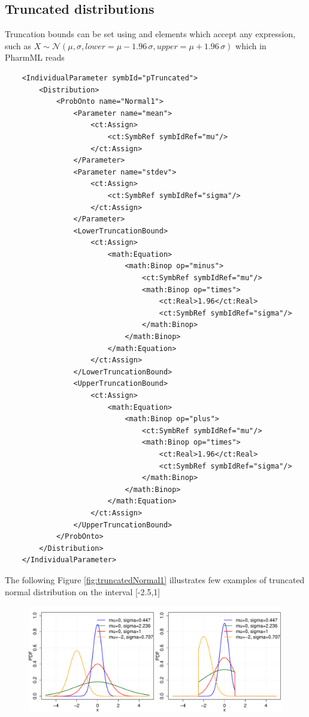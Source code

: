 {\subsection{Truncated distributions}
Truncation bounds can be set using  and 
 elements which accept any expression, such as
$X \sim \mathcal N(\mu,\sigma,lower=\mu-1.96\,\sigma,upper=\mu+1.96\,\sigma)$
which in PharmML reads
\lstset{language=XML}
\begin{lstlisting}
    <IndividualParameter symbId="pTruncated">
        <Distribution>
            <ProbOnto name="Normal1">
                <Parameter name="mean">
                    <ct:Assign>
                        <ct:SymbRef symbIdRef="mu"/>
                    </ct:Assign>
                </Parameter>
                <Parameter name="stdev">
                    <ct:Assign>
                        <ct:SymbRef symbIdRef="sigma"/>
                    </ct:Assign>
                </Parameter>
                <LowerTruncationBound>
                    <ct:Assign>
                        <math:Equation>
                            <math:Binop op="minus">
                                <ct:SymbRef symbIdRef="mu"/>
                                <math:Binop op="times">
                                    <ct:Real>1.96</ct:Real>
                                    <ct:SymbRef symbIdRef="sigma"/>
                                </math:Binop>
                            </math:Binop>
                        </math:Equation>
                    </ct:Assign>
                </LowerTruncationBound>
                <UpperTruncationBound>
                    <ct:Assign>
                        <math:Equation>
                            <math:Binop op="plus">
                                <ct:SymbRef symbIdRef="mu"/>
                                <math:Binop op="times">
                                    <ct:Real>1.96</ct:Real>
                                    <ct:SymbRef symbIdRef="sigma"/>
                                </math:Binop>
                            </math:Binop>
                        </math:Equation>
                    </ct:Assign>
                </UpperTruncationBound>
            </ProbOnto>
        </Distribution>
    </IndividualParameter>
\end{lstlisting}
The following Figure \ref{fig:truncatedNormal1} illustrates few examples of truncated 
normal distribution on the interval [-2.5,1]
\begin{figure}[htb!]
\centering
 \includegraphics[width=140mm]{pics/TruncatedNormal1.pdf}

\end{figure}}
